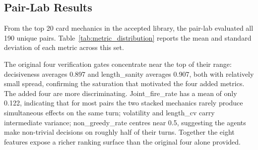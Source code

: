 \documentclass[conference]{IEEEtran}
\begin{document}
  \subsection{Pair-Lab Results}                                               
                                                                                
  From the top 20 card mechanics in the accepted library, the pair-lab evaluated
   all 190 unique pairs. Table~\ref{tab:metric_distribution} reports the mean   
  and standard deviation of each metric across this set.                      
                                               
  The original four verification gates concentrate near the top of their range:
  decisiveness averages 0.897 and length\_sanity averages 0.907, both with
  relatively small spread, confirming the saturation that motivated the four
  added metrics. The added four are more discriminating. Joint\_fire\_rate has a
   mean of only 0.122, indicating that for most pairs the two stacked mechanics 
  rarely produce simultaneous effects on the same turn; volatility and          
  length\_cv carry intermediate variance; non\_greedy\_rate centres near 0.5,   
  suggesting the agents make non-trivial decisions on roughly half of their   
  turns. Together the eight features expose a richer ranking surface than the   
  original four alone provided.
                                                                                
\end{document}
